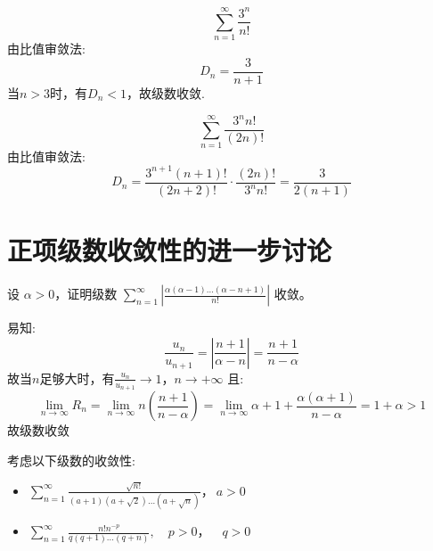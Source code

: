 \[
    \sum_{n=1}^{\infty} \frac{3^n}{n!}
\]
由比值审敛法:
\[
    D_{n} = \frac{3}{n+1}
\]
当\(n>3\)时，有\(D_{n} < 1\)，故级数收敛.

\[
    \sum_{n=1}^{\infty} \frac{3^{n}n!}{(2n)!}
\]
由比值审敛法:
\[
    D_{n} = \frac{3^{n+1}(n+1)!}{(2n+2)!} \cdot \frac{(2n)!}{3^{n}n!}
    = \frac{3}{2(n+1)}
\]

\section{正项级数收敛性的进一步讨论}

\begin{problem}
    设 \(\alpha > 0\)，证明级数 \(\sum_{n=1}^{\infty} \left|
        \frac{\alpha(\alpha - 1) \dots (\alpha - n + 1)}{n!}
    \right| \) 收敛。
\end{problem}

\begin{solution}
    易知: \[
        \frac{u_{n}}{u_{n+1}}= \left| \frac{n+1}{\alpha-n} \right| =
        \frac{n+1}{n-\alpha}
    \]
    故当\(n\)足够大时，有\(\frac{u_{n}}{u_{n+1}}\to 1\)，\(n \to +\infty\)
    且:
    \[
        \lim_{n \to \infty} R_{n} = \lim_{n \to \infty} n \left(
        \frac{n+1}{n-\alpha} \right)
        =\lim_{n \to \infty} \alpha +1 +
        \frac{\alpha(\alpha+1)}{n-\alpha} = 1+\alpha > 1
    \]
    故级数收敛
\end{solution}

\begin{problem}
    考虑以下级数的收敛性:
    \begin{itemize}
        \item \(\sum_{n=1}^{\infty}
                \frac{\sqrt{n!}}{(a+1)(a+\sqrt{2}) \dots
            (a+\sqrt{n})}，\ a > 0\)
        \item \(\sum_{n=1}^{\infty} \frac{n!n^{-p}}{q(q+1)
                \dots (q+n)},
            \quad p > 0，\quad q > 0\)
    \end{itemize}
\end{problem}

